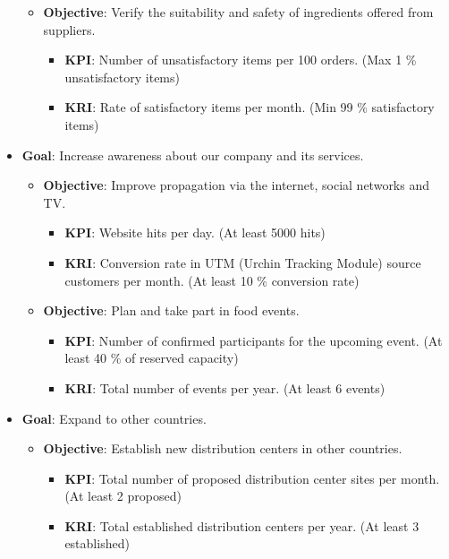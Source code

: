 \documentclass[11pt,a4paper]{article}
\begin{document}
\begin{itemize}
\begin{itemize}
\begin{itemize}
        \end{itemize}
        \item \textbf{Objective}: Verify the suitability and safety of ingredients offered from suppliers.
        \begin{itemize}
            \item \textbf{KPI}: Number of unsatisfactory items per 100 orders. (Max 1 \% unsatisfactory items)
            \item \textbf{KRI}: Rate of satisfactory items per month. (Min 99 \% satisfactory items)
        \end{itemize}
    \end{itemize}
    \item \textbf{Goal}: Increase awareness about our company and its services.
    \begin{itemize}
        \item \textbf{Objective}: Improve propagation via the internet, social networks and TV.
        \begin{itemize}
            \item \textbf{KPI}: Website hits per day. (At least 5000 hits)
            \item \textbf{KRI}: Conversion rate in UTM (Urchin Tracking Module) source customers per month. (At least 10 \% conversion rate)
        \end{itemize}
        \item \textbf{Objective}: Plan and take part in food events.
        \begin{itemize}
            \item \textbf{KPI}: Number of confirmed participants for the upcoming event. (At least 40 \% of reserved capacity)
            \item \textbf{KRI}: Total number of events per year. (At least 6 events)
        \end{itemize}
    \end{itemize}
    \item \textbf{Goal}: Expand to other countries.
    \begin{itemize}
        \item \textbf{Objective}: Establish new distribution centers in other countries.
        \begin{itemize}
            \item \textbf{KPI}: Total number of proposed distribution center sites per month. (At least 2 proposed)
            \item \textbf{KRI}: Total established distribution centers per year. (At least 3 established)

\end{itemize}
\end{itemize}
\end{itemize}
\end{document}
